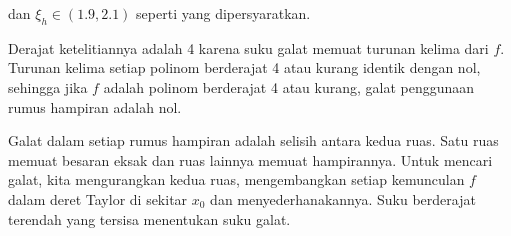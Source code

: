 \begin{description}
dan $\xi_{h}\in(1.9,2.1)$ seperti yang dipersyaratkan.
\item [{\ref{exc:calculusErrors-10}:}] Derajat ketelitiannya adalah 4
karena suku galat memuat turunan kelima dari $f$. Turunan kelima
setiap polinom berderajat 4 atau kurang identik dengan nol, sehingga
jika $f$ adalah polinom berderajat 4 atau kurang, galat penggunaan
rumus hampiran adalah nol.
\item [{\ref{exc:calculusErrors-11}:}] \label{sol:exc:calculusErrors-11}Galat
dalam setiap rumus hampiran adalah selisih antara kedua ruas. Satu
ruas memuat besaran eksak dan ruas lainnya memuat hampirannya. Untuk
mencari galat, kita mengurangkan kedua ruas, mengembangkan setiap
kemunculan $f$ dalam deret Taylor di sekitar $x_{0}$ dan menyederhanakannya.
Suku berderajat terendah yang tersisa menentukan suku galat.


\end{description}
